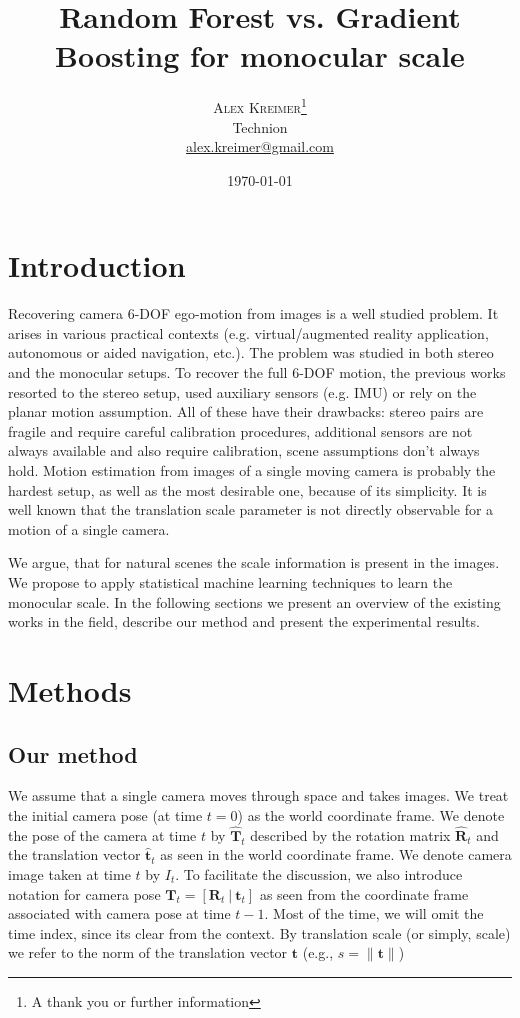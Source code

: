 \documentclass[twoside]{article}
\title{Random Forest vs. Gradient Boosting for monocular scale} %
\author{%
\textsc{Alex Kreimer}\thanks{A thank you or further information} \\[1ex] %
\normalsize Technion \\ %
\normalsize \href{mailto:alex.kreimer@gmail.com}{alex.kreimer@gmail.com} %
}
\date{\today} %
\begin{document}
\maketitle

\section{Introduction}
Recovering camera 6-DOF ego-motion from images is a well studied
problem. It arises in various practical contexts
(e.g. virtual/augmented reality application, autonomous or aided
navigation, etc.).  The problem was studied in both stereo and the
monocular setups.  To recover the full 6-DOF motion, the previous
works resorted to the stereo setup, used auxiliary sensors (e.g. IMU)
or rely on the planar motion assumption.  All of these have their
drawbacks: stereo pairs are fragile and require careful calibration
procedures, additional sensors are not always available and also
require calibration, scene assumptions don't always hold.  Motion
estimation from images of a single moving camera is probably the
hardest setup, as well as the most desirable one, because of its
simplicity.  It is well known that the translation scale parameter is
not directly observable for a motion of a single camera.

We argue, that for natural scenes the scale information is present in
the images.  We propose to apply statistical machine learning
techniques to learn the monocular scale.  In the following sections we
present an overview of the existing works in the field, describe our
method and present the experimental results.

\section{Methods}
\subsection{Our method}\label{sec:our method}

We assume that a single camera moves through space and takes images.
We treat the initial camera pose (at time $t=0$) as the world
coordinate frame.  We denote the pose of the camera at time $t$ by
$\mathbf{\hat{T}}_t$ described by the rotation matrix
$\mathbf{\hat{R}}_t$ and the translation vector $\mathbf{\hat{t}}_t$
as seen in the world coordinate frame.  We denote camera image taken
at time $t$ by $I_t$.  To facilitate the discussion, we also introduce
notation for camera pose
$\mathbf{T}_t = [\mathbf{R}_t\ |\ \mathbf{t}_t] $ as seen from the
coordinate frame associated with camera pose at time $t-1$.  Most of
the time, we will omit the time index, since its clear from the
context.  By translation scale (or simply, scale) we refer to the norm
of the translation vector $\mathbf{t}$ (e.g.,
$s = \lVert \mathbf{t} \rVert$)
\end{document}
